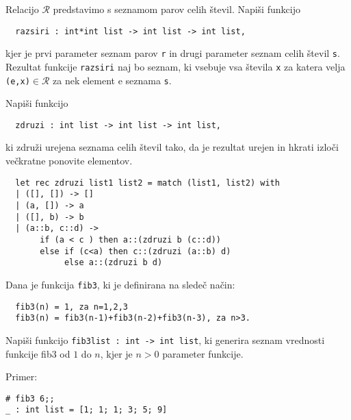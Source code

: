 \begin{ex}
  Relacijo $\mathcal{R}$ predstavimo s seznamom parov celih \v
  stevil. Napi\v si funkcijo

  \begin{lstlisting}
  razsiri : int*int list -> int list -> int list,
  \end{lstlisting}

  kjer je prvi parameter seznam parov \lstinline{r} in drugi parameter
  seznam celih \v stevil \lstinline{s}. Rezultat funkcije
  \lstinline{razsiri} naj bo seznam, ki vsebuje vsa \v stevila \lstinline{x}
  za katera velja \lstinline{(e,x)}$\in\mathcal{R}$ za nek element e
  seznama \lstinline{s}.


\end{ex} 
\begin{ex}
  Napi\v si funkcijo

  \begin{lstlisting}
  zdruzi : int list -> int list -> int list,
\end{lstlisting}

  ki zdru\v zi urejena seznama celih \v stevil tako, da je rezultat
  urejen in hkrati izlo\v ci ve\v ckratne ponovite elementov.


  \begin{sol}
  \begin{lstlisting}
  let rec zdruzi list1 list2 = match (list1, list2) with
  | ([], []) -> []
  | (a, []) -> a
  | ([], b) -> b
  | (a::b, c::d) -> 
       if (a < c ) then a::(zdruzi b (c::d))
       else if (c<a) then c::(zdruzi (a::b) d)
            else a::(zdruzi b d)
  \end{lstlisting}
  \end{sol}

\end{ex} 
\begin{ex}
  Dana je funkcija \lstinline{fib3}, ki je definirana na slede\v c na\v cin:
\begin{lstlisting}
  fib3(n) = 1, za n=1,2,3
  fib3(n) = fib3(n-1)+fib3(n-2)+fib3(n-3), za n>3.
\end{lstlisting}

  Napi\v si funkcijo 
  \lstinline{fib3list : int -> int list}, ki generira seznam
  vrednosti funkcije fib3 od $1$ do $n$, kjer je $n>0$ parameter funkcije.

\noindent\/Primer:
\begin{lstlisting}
# fib3 6;;
_ : int list = [1; 1; 1; 3; 5; 9]
\end{lstlisting}

%
%
%

\end{ex} 
